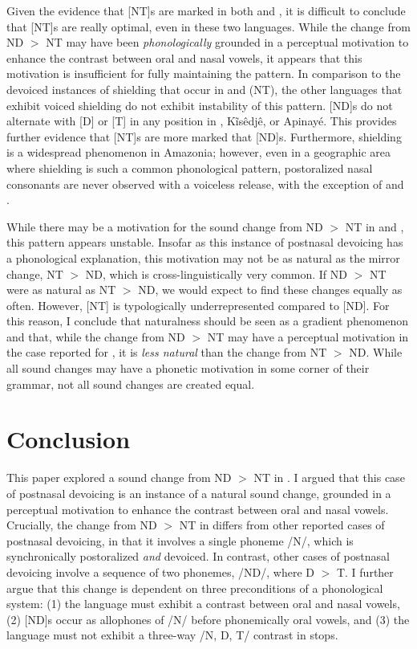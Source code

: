 \documentclass[output=paper,hidelinks]{langscibook}
\begin{document}
Given the evidence that [NT]s are marked in both  and , it is difficult to conclude that [NT]s are really optimal, even in these two languages. While the change from ND $>$ NT may have been \textit{phonologically} grounded in a perceptual motivation to enhance the contrast between oral and nasal vowels, it appears that this motivation is insufficient for fully maintaining the pattern. In comparison to the devoiced instances of shielding that occur in  and  (NT), the other  languages that exhibit voiced shielding do not exhibit instability of this pattern. [ND]s do not alternate with [D] or [T] in any position in , K\~is\^edj\^e, or Apinay\'e. This provides further evidence that [NT]s are more marked that [ND]s. Furthermore, shielding is a widespread phenomenon in Amazonia; however, even in a geographic area where shielding is such a common phonological pattern, postoralized nasal consonants are never observed with a voiceless release, with the exception of  and .

While there may be a motivation for the sound change from ND $>$ NT in  and , this pattern appears unstable. Insofar as this instance of postnasal devoicing has a phonological explanation, this motivation may not be as natural as the mirror change, NT $>$ ND, which is cross-linguistically very common. If ND $>$ NT were as natural as NT $>$ ND, we would expect to find these changes equally as often. However, [NT] is typologically underrepresented compared to [ND]. For this reason, I conclude that naturalness should be seen as a gradient phenomenon and that, while the change from ND $>$ NT may have a perceptual motivation in the case reported for , it is \textit{less natural} than the change from NT $>$ ND. While all sound changes may have a phonetic motivation in some corner of their grammar, not all sound changes are created equal.

\section{Conclusion}

This paper explored a sound change from ND $>$ NT in . I argued that this case of postnasal devoicing is an instance of a natural sound change, grounded in a perceptual motivation to enhance the contrast between oral and nasal vowels. Crucially, the change from ND $>$ NT in  differs from other reported cases of postnasal devoicing, in that it involves a single phoneme /N/, which is synchronically postoralized \textit{and} devoiced. In contrast, other cases of postnasal devoicing involve a sequence of two phonemes, /ND/, where D $>$ T. I further argue that this change is dependent on three preconditions of a phonological system: (1) the language must exhibit a contrast between oral and nasal vowels, (2) [ND]s occur as allophones of /N/ before phonemically oral vowels, and (3) the language must not exhibit a three-way /N, D, T/ contrast in stops.
\end{document}
